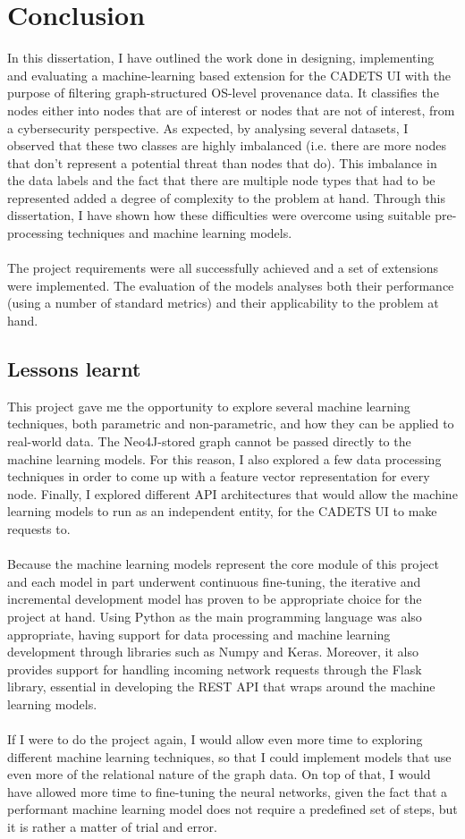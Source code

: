 
	\chapter{Conclusion}
		In this dissertation, I have outlined the work done in designing, implementing and evaluating a machine-learning based extension for the CADETS UI with the purpose of filtering graph-structured OS-level provenance data. It classifies the nodes either into nodes that are of interest or nodes that are not of interest, from a cybersecurity perspective. As expected, by analysing several datasets, I observed that these two classes are highly imbalanced (i.e. there are more nodes that don't represent a potential threat than nodes that do). This imbalance in the data labels and the fact that there are multiple node types that had to be represented added a degree of complexity to the problem at hand. Through this dissertation, I have shown how these difficulties were overcome using suitable pre-processing techniques and machine learning models. 
		\\ \\
		The project requirements were all successfully achieved and a set of extensions were implemented. The evaluation of the models analyses both their performance (using a number of standard metrics) and their applicability to the problem at hand. 
		
	\section{Lessons learnt} 
		This project gave me the opportunity to explore several machine learning techniques, both parametric and non-parametric, and how they can be applied to real-world data. The Neo4J-stored graph cannot be passed directly to the machine learning models. For this reason, I also explored a few data processing techniques in order to come up with a feature vector representation for every node. Finally, I explored different API architectures that would allow the machine learning models to run as an independent entity, for the CADETS UI to make requests to.
		\\ \\
		Because the machine learning models represent the core module of this project and each model in part underwent continuous fine-tuning, the iterative and incremental development model has proven to be appropriate choice for the project at hand. Using Python as the main programming language was also appropriate, having support for data processing and machine learning development through libraries such as Numpy and Keras. Moreover, it also provides support for handling incoming network requests through the Flask library, essential in developing the REST API that wraps around the machine learning models.
		\\ \\
		If I were to do the project again, I would allow even more time to exploring different machine learning techniques, so that I could implement models that use even more of the relational nature of the graph data. On top of that, I would have allowed more time to fine-tuning the neural networks, given the fact that a performant machine learning model does not require a predefined set of steps, but it is rather a matter of trial and error.
